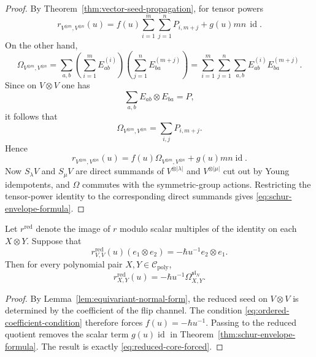 \begin{proof}
By Theorem~\ref{thm:vector-seed-propagation}, for tensor powers
\begin{equation}
r_{V^{\otimes m},V^{\otimes n}}(u)
=
f(u)\sum_{i=1}^{m}\sum_{j=1}^{n}P_{i,m+j}
+g(u)mn\,\operatorname{id}.
\end{equation}
On the other hand,
\begin{equation}
\Omega_{V^{\otimes m},V^{\otimes n}}
=
\sum_{a,b}\left(\sum_{i=1}^{m}E_{ab}^{(i)}\right)
\left(\sum_{j=1}^{n}E_{ba}^{(m+j)}\right)
=
\sum_{i=1}^{m}\sum_{j=1}^{n} \sum_{a,b}E_{ab}^{(i)}E_{ba}^{(m+j)}.
\end{equation}
Since on $V\otimes V$ one has
\begin{equation}
\sum_{a,b}E_{ab}\otimes E_{ba}=P,
\end{equation}
it follows that
\begin{equation}
\Omega_{V^{\otimes m},V^{\otimes n}}=\sum_{i,j}P_{i,m+j}.
\end{equation}
Hence
\begin{equation}
r_{V^{\otimes m},V^{\otimes n}}(u)
=
f(u)\Omega_{V^{\otimes m},V^{\otimes n}}+g(u)mn\operatorname{id}.
\end{equation}
Now $S_\lambda V$ and $S_\mu V$ are direct summands of
$V^{\otimes |\lambda|}$ and $V^{\otimes |\mu|}$ cut out by Young
idempotents, and $\Omega$ commutes with the symmetric-group actions.
Restricting the tensor-power identity to the corresponding direct summands
gives \eqref{eq:schur-envelope-formula}.
\end{proof}

\begin{corollary}
\ClaimStatusProvedHere
\label{cor:one-coefficient-forces-reduced-core}
Let $r^{\mathrm{red}}$ denote the image of $r$ modulo scalar multiples of
the identity on each $X\otimes Y$. Suppose that
\begin{equation}
\label{eq:ordered-coefficient-condition}
r^{\mathrm{red}}_{V,V}(u)(e_1\otimes e_2)
=
-\hbar u^{-1}e_2\otimes e_1.
\end{equation}
Then for every polynomial pair $X,Y\in \mathcal C_{\mathrm{poly}}$,
\begin{equation}
\label{eq:reduced-core-forced}
r^{\mathrm{red}}_{X,Y}(u)
=
-\hbar u^{-1}\Omega^{\mathfrak{sl}_N}_{X,Y}.
\end{equation}
\end{corollary}

\begin{proof}
By Lemma~\ref{lem:equivariant-normal-form}, the reduced seed on
$V\otimes V$ is determined by the coefficient of the flip channel. The
condition \eqref{eq:ordered-coefficient-condition} therefore forces
$f(u)=-\hbar u^{-1}$. Passing to the reduced quotient removes the scalar
term $g(u)\operatorname{id}$ in
Theorem~\ref{thm:schur-envelope-formula}. The result is exactly
\eqref{eq:reduced-core-forced}.
\end{proof}

